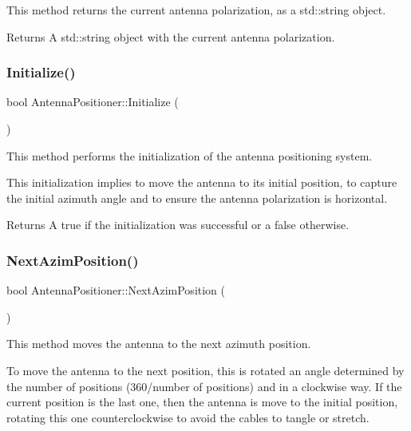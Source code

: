 This method returns the current antenna polarization, as a {\ttfamily std\+::string} object. 

\begin{DoxyReturn}{Returns}
A {\ttfamily std\+::string} object with the current antenna polarization. 
\end{DoxyReturn}
\mbox{\label{classAntennaPositioner_a5087caa452709b33082c41b2cef2a23e}} 
\subsubsection{\texorpdfstring{Initialize()}{Initialize()}}
{\footnotesize\ttfamily bool Antenna\+Positioner\+::\+Initialize (\begin{DoxyParamCaption}{ }\end{DoxyParamCaption})}



This method performs the initialization of the antenna positioning system. 

This initialization implies to move the antenna to its initial position, to capture the initial azimuth angle and to ensure the antenna polarization is horizontal. \begin{DoxyReturn}{Returns}
A {\ttfamily true} if the initialization was successful or a {\ttfamily false} otherwise. 
\end{DoxyReturn}
\mbox{\label{classAntennaPositioner_a2e05c385b9933d2ee1d4f8f953c99070}} 
\subsubsection{\texorpdfstring{Next\+Azim\+Position()}{NextAzimPosition()}}
{\footnotesize\ttfamily bool Antenna\+Positioner\+::\+Next\+Azim\+Position (\begin{DoxyParamCaption}{ }\end{DoxyParamCaption})}



This method moves the antenna to the next azimuth position. 

To move the antenna to the next position, this is rotated an angle determined by the number of positions (360/number of positions) and in a clockwise way. If the current position is the last one, then the antenna is move to the initial position, rotating this one counterclockwise to avoid the cables to tangle or stretch.

